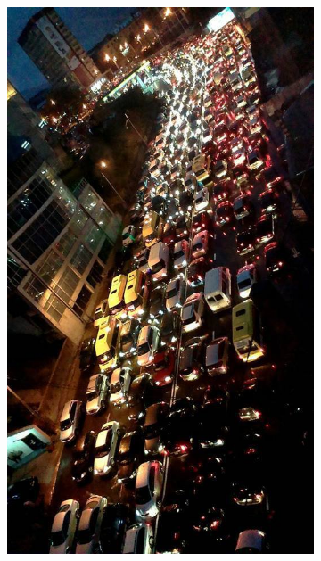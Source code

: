 \begin{figure}[h]
    \centering
    \begin{subfigure}{0.45\textwidth}
        \centering
        \includegraphics[width=\linewidth]{images/methodology/vake-traffic-1.jpg}
    \end{subfigure}
    \hfill
    \begin{subfigure}{0.45\textwidth}
        \centering

\end{subfigure}
\end{figure}
